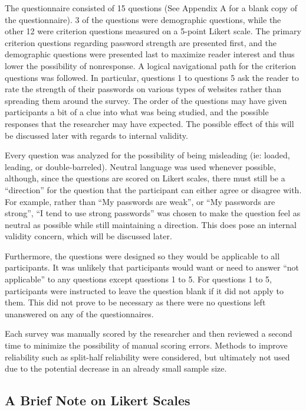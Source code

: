 \documentclass[letterpaper, 10 pt, conference]{ieeeconf}  %
\begin{document}
The questionnaire consisted of 15 questions (See Appendix A for a blank copy of the questionnaire). 3 of the questions were demographic questions, while the other 12 were criterion questions measured on a 5-point Likert scale. The primary criterion questions regarding password strength are presented first, and the demographic questions were presented last to maximize reader interest and thus lower the possibility of nonresponse. A logical navigational path for the criterion questions was followed. In particular, questions 1 to questions 5 ask the reader to rate the strength of their passwords on various types of websites rather than spreading them around the survey. The order of the questions may have given participants a bit of a clue into what was being studied, and the possible responses that the researcher may have expected. The possible effect of this will be discussed later with regards to internal validity. 

Every question was analyzed for the possibility of being misleading (ie: loaded, leading, or double-barreled). Neutral language was used whenever possible, although, since the questions are scored on Likert scales, there must still be a “direction” for the question that the participant can either agree or disagree with. For example, rather than “My passwords are weak”, or “My passwords are strong”, “I tend to use strong passwords” was chosen to make the question feel as neutral as possible while still maintaining a direction. This does pose an internal validity concern, which will be discussed later.

Furthermore, the questions were designed so they would be applicable to all participants. It was unlikely that participants would want or need to answer “not applicable” to any questions except questions 1 to 5. For questions 1 to 5, participants were instructed to leave the question blank if it did not apply to them. This did not prove to be necessary as there were no questions left unanswered on any of the questionnaires.  

Each survey was manually scored by the researcher and then reviewed a second time to minimize the possibility of manual scoring errors. Methods to improve reliability such as split-half reliability were considered, but ultimately not used due to the potential decrease in an already small sample size.

\subsection{A Brief Note on Likert Scales}
\end{document}
